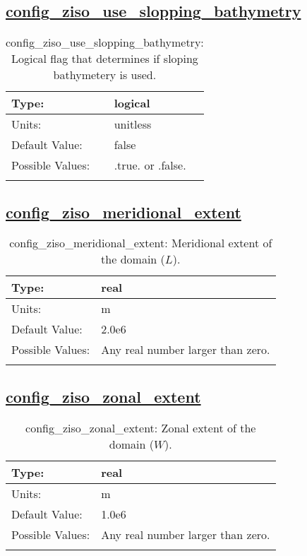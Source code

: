 \subsection[config\_ziso\_use\_slopping\_bathymetry]{\hyperref[sec:nm_tab_ziso]{config\_ziso\_use\_slopping\_bathymetry}}
\label{subsec:nm_sec_config_ziso_use_slopping_bathymetry}
\begin{center}
\begin{longtable}{| p{2.0in} || p{4.0in} |}
    \hline
    Type: & logical \\
    \hline
    Units: & \si{unitless} \\
    \hline
    Default Value: & false \\
    \hline
    Possible Values: & .true. or .false. \\
    \hline
    \caption{config\_ziso\_use\_slopping\_bathymetry: Logical flag that determines if sloping bathymetery is used.}
\end{longtable}
\end{center}
\subsection[config\_ziso\_meridional\_extent]{\hyperref[sec:nm_tab_ziso]{config\_ziso\_meridional\_extent}}
\label{subsec:nm_sec_config_ziso_meridional_extent}
\begin{center}
\begin{longtable}{| p{2.0in} || p{4.0in} |}
    \hline
    Type: & real \\
    \hline
    Units: & \si{m} \\
    \hline
    Default Value: & 2.0e6 \\
    \hline
    Possible Values: & Any real number larger than zero. \\
    \hline
    \caption{config\_ziso\_meridional\_extent: Meridional extent of the domain ($L$).}
\end{longtable}
\end{center}
\subsection[config\_ziso\_zonal\_extent]{\hyperref[sec:nm_tab_ziso]{config\_ziso\_zonal\_extent}}
\label{subsec:nm_sec_config_ziso_zonal_extent}
\begin{center}
\begin{longtable}{| p{2.0in} || p{4.0in} |}
    \hline
    Type: & real \\
    \hline
    Units: & \si{m} \\
    \hline
    Default Value: & 1.0e6 \\
    \hline
    Possible Values: & Any real number larger than zero. \\
    \hline
    \caption{config\_ziso\_zonal\_extent: Zonal extent of the domain ($W$).}
\end{longtable}
\end{center}
